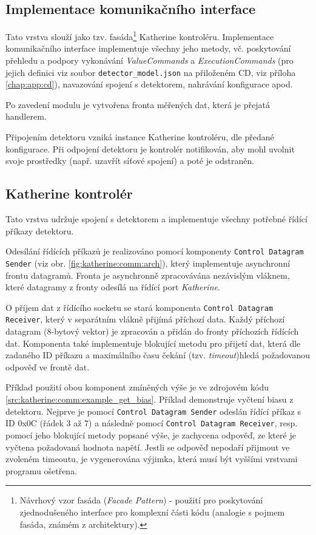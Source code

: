 \subsection{Implementace komunikačního interface}
Tato vrstva slouží jako tzv. fasáda\footnote{Návrhový vzor fasáda (\textit{Facade Pattern}) - použití pro poskytování zjednodušeného interface pro komplexní části kódu (analogie s pojmem fasáda, známém z architektury).} Katherine kontroléru. Implementace komunikačního interface implementuje všechny jeho metody, vč. poskytování přehledu a podpory vykonávání \textit{ValueCommands} a \textit{ExecutionCommands} (pro jejich definici viz soubor \texttt{detector\_model.json} na přiloženém CD, viz příloha \ref{chap:app:cd}), navazování spojení s detektorem, nahrávání konfigurace apod.

Po zavedení modulu je vytvořena fronta měřených dat, která je přejatá handlerem.

Připojením detektoru vzniká instance Katherine kontroléru, dle předané konfigurace. Při odpojení detektoru je kontrolér notifikován, aby mohl uvolnit svoje prostředky (např. uzavřít síťové spojení) a poté je odstraněn.

\subsection{Katherine kontrolér}
Tato vrstva udržuje spojení s detektorem a implementuje všechny potřebné řídící příkazy detektoru.

Odesílání řídících příkazů je realizováno pomocí komponenty \texttt{Control Datagram Sender} (viz obr. \ref{fig:katherine:comm:arch}), který implementuje asynchronní frontu datagramů. Fronta je asynchronně zpracovávána nezávislým vláknem, které datagramy z fronty odesílá na řídící port \textit{Katherine}.

O příjem dat z řídícího socketu se stará komponenta \texttt{Control Datagram Receiver}, který v separátním vlákně přijímá příchozí data. Každý příchozí datagram (8-bytový vektor) je zpracován a přidán do fronty příchozích řídících dat. Komponenta také implementuje blokující metodu pro přijetí dat, která dle zadaného ID příkazu a maximálního času čekání (tzv. \textit{timeout})hledá požadovanou odpověď ve frontě dat.

Příklad použití obou komponent zmíněných výše je ve zdrojovém kódu \ref{src:katherine:comm:example_get_bias}. Příklad demonstruje vyčtení biasu z detektoru. Nejprve je pomocí \texttt{Control Datagram Sender} odeslán řídící příkaz s ID 0x0C (řádek 3 až 7) a následně pomocí \texttt{Control Datagram Receiver}, resp. pomocí jeho blokující metody popsané výše, je zachycena odpověď, ze které je vyčtena požadovaná hodnota napětí. Jestli se odpověď nepodaří přijmout ve zvoleném timeoutu, je vygenerována výjimka, která musí být vyššími vrstvami programu ošetřena.

